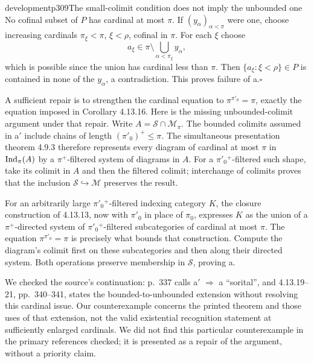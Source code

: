 \begin{dcomment}{development}{p309}{The small-colimit condition does not imply the unbounded one}
No cofinal subset of $P$ has cardinal at most $\pi$. If $(y_\alpha)_{\alpha<\pi}$ were one, choose increasing cardinals $\pi_\xi<\pi$, $\xi<\rho$, cofinal in $\pi$. For each $\xi$ choose
\[
 a_\xi\in\pi\setminus\bigcup_{\alpha<\pi_\xi}y_\alpha,
\]
which is possible since the union has cardinal less than $\pi$. Then $\{a_\xi:\xi<\rho\}\in P$ is contained in none of the $y_\alpha$, a contradiction. This proves failure of a.\hfill$\square$

A sufficient repair is to strengthen the cardinal equation to $\pi^{\pi'_0}=\pi$, exactly the equation imposed in Corollary 4.13.16. Here is the missing unbounded-colimit argument under that repair. Write $A=\mathcal S\cap\mathcal M_\pi$. The bounded colimits assumed in a$'$ include chains of length $(\pi'_0)^+\leq\pi$. The simultaneous presentation theorem 4.9.3 therefore represents every diagram of cardinal at most $\pi$ in $\mathrm{Ind}_\pi(A)$ by a $\pi^+$-filtered system of diagrams in $A$. For a $\pi'_0{}^+$-filtered such shape, take its colimit in $A$ and then the filtered colimit; interchange of colimits proves that the inclusion $\mathcal S\hookrightarrow\mathcal M$ preserves the result.

For an arbitrarily large $\pi'_0{}^+$-filtered indexing category $K$, the closure construction of 4.13.13, now with $\pi'_0$ in place of $\pi_0$, expresses $K$ as the union of a $\pi^+$-directed system of $\pi'_0{}^+$-filtered subcategories of cardinal at most $\pi$. The equation $\pi^{\pi'_0}=\pi$ is precisely what bounds that construction. Compute the diagram's colimit first on these subcategories and then along their directed system. Both operations preserve membership in $\mathcal S$, proving a.

We checked the source's continuation: p.~337 calls a$'$ $\Rightarrow$ a ``sorital'', and 4.13.19--21, pp.~340--341, states the bounded-to-unbounded extension without resolving this cardinal issue. Our counterexample concerns the printed theorem and those uses of that extension, not the valid existential recognition statement at sufficiently enlarged cardinals. We did not find this particular counterexample in the primary references checked; it is presented as a repair of the argument, without a priority claim.
\end{dcomment}


